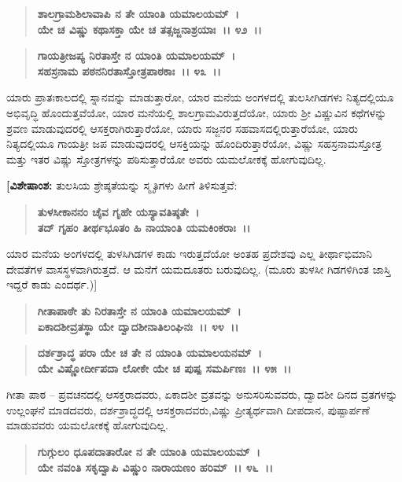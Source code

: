 \begin{verse}
\textbf{ಶಾಲಗ್ರಾಮಶಿಲಾವಾಪಿ ನ ತೇ ಯಾಂತಿ ಯಮಾಲಯಮ್~।}\\\textbf{ಯೇ ಚ ವಿಷ್ಣು ಕಥಾಸಕ್ತಾ ಯೇ ಚ ತತ್ಸಜ್ಜನಾಶ್ರಯಾಃ~।। ೪೨~।।}
\end{verse}

\begin{verse}
\textbf{ಗಾಯತ್ರೀಜಪ್ಯ ನಿರತಾಸ್ತೇ ನ ಯಾಂತಿ ಯಮಾಲಯಮ್~।}\\\textbf{ಸಹಸ್ರನಾಮ ಪಠನನಿರತಾಸ್ತೋತ್ರಪಾಠಕಾಃ~।। ೪೩~।।}
\end{verse}

ಯಾರು ಪ್ರಾತಃಕಾಲದಲ್ಲಿ ಸ್ನಾನವನ್ನು ಮಾಡುತ್ತಾರೋ, ಯಾರ ಮನೆಯ ಅಂಗಳದಲ್ಲಿ ತುಲಸೀಗಿಡಗಳು ನಿತ್ಯದಲ್ಲಿಯೂ ಅಭಿವೃದ್ಧಿ ಹೊಂದುತ್ತವೆಯೋ, ಯಾರ ಮನೆಯಲ್ಲಿ ಶಾಲಗ್ರಾಮವಿರುತ್ತದೆಯೋ, ಯಾರು ಶ‍್ರೀ ವಿಷ್ಣುವಿನ ಕಥೆಗಳನ್ನು ಶ್ರವಣ ಮಾಡುವುದರಲ್ಲಿ ಆಸಕ್ತರಾಗಿರುತ್ತಾರೆಯೋ, ಯಾರು ಸಜ್ಜನರ ಸಹವಾಸದಲ್ಲಿರುತ್ತಾರೆಯೋ, ಯಾರು ನಿತ್ಯದಲ್ಲಿಯೂ ಗಾಯತ್ರೀ ಜಪ ಮಾಡುವುದರಲ್ಲಿ ಆಸಕ್ತಿಯನ್ನು ಹೊಂದಿರುತ್ತಾರೆಯೋ, ವಿಷ್ಣು ಸಹಸ್ರನಾಮಸ್ತೋತ್ರ ಮತ್ತು ಇತರ ವಿಷ್ಣು ಸ್ತೋತ್ರಗಳನ್ನು ಪಠಿಸುತ್ತಾರೆಯೋ ಅವರು ಯಮಲೋಕಕ್ಕೆ ಹೋಗುವುದಿಲ್ಲ.

\textbf{[ವಿಶೇಷಾಂಶ:} ತುಲಸಿಯ ಶ್ರೇಷ್ಠತೆಯನ್ನು ಸ್ಮೃತಿಗಳು ಹೀಗೆ ತಿಳಿಸುತ್ತವೆ:

\begin{verse}
\textbf{ತುಳಸೀಕಾನನಂ ಚೈವ ಗೃಹೇ ಯಸ್ಯಾವತಿಷ್ಠತೇ~।}\\\textbf{ತದ್ ಗೃಹಂ ತೀರ್ಥಭೂತಂ ಹಿ ನಾಯಾಂತಿ ಯಮಕಿಂಕರಾಃ~।।}
\end{verse}

ಯಾರ ಮನೆಯ ಅಂಗಳದಲ್ಲಿ ತುಳಸಿಗಿಡಗಳ ಕಾಡು ಇರುತ್ತದೆಯೋ ಅಂತಹ ಪ್ರದೇಶವು ಎಲ್ಲ ತೀರ್ಥಾಭಿಮಾನಿ ದೇವತೆಗಳ ವಾಸಸ್ಥಳವಾಗಿರುತ್ತದೆ. ಆ ಮನೆಗೆ ಯಮದೂತರು ಬರುವುದಿಲ್ಲ. (ಮೂರು ತುಳಸೀ ಗಿಡಗಳಿಗಿಂತ ಜಾಸ್ತಿ ಇದ್ದರೆ ಕಾಡು ಎಂದರ್ಥ.)]

\begin{verse}
\textbf{ಗೀತಾಪಾಠೇ ತು ನಿರತಾಸ್ತೇ ನ ಯಾಂತಿ ಯಮಾಲಯಮ್~।}\\\textbf{ಏಕಾದಶೀವ್ರತಸ್ಥಾ ಯೇ ದ್ವಾದಶೀನಾತಿಲಂಘಿನಃ~।। ೪೪~।।} 
\end{verse}

\begin{verse}
\textbf{ದರ್ಶಶ್ರಾದ್ಧ ಪರಾ ಯೇ ಚ ತೇ ನ ಯಾಂತಿ ಯಮಾಲಯನಮ್~।}\\\textbf{ಯೇ ವಿಷ್ಣೋರ್ದೀಪದಾ ಲೋಕೇ ಯೇ ಚ ಪುಷ್ಪ ಸಮರ್ಪಿಣಃ~।। ೪೫~।। }
\end{verse}

ಗೀತಾ ಪಾಠ – ಪ್ರವಚನದಲ್ಲಿ ಆಸಕ್ತರಾದವರು, ಏಕಾದಶೀ ವ್ರತವನ್ನು ಅನುಸರಿಸುವವರು, ದ್ವಾದಶೀ ದಿನದ ವ್ರತಗಳನ್ನು ಉಲ್ಲಂಘನೆ ಮಾಡದವರು, ದರ್ಶಶ್ರಾದ್ಧದಲ್ಲಿ ಆಸಕ್ತರಾದವರು,ವಿಷ್ಣು ಪ್ರೀತ್ಯರ್ಥವಾಗಿ ದೀಪದಾನ, ಪುಷ್ಪಾರ್ಪಣೆ ಮಾಡುವವರು ಯಮಲೋಕಕ್ಕೆ ಹೋಗುವುದಿಲ್ಲ.

\begin{verse}
\textbf{ಗುಗ್ಗುಲಂ ಧೂಪದಾತಾರೋ ನ ತೇ ಯಾಂತಿ ಯಮಾಲಯಮ್~।}\\\textbf{ಯೇ ನವಂತಿ ಸಕೃದ್ವಾಪಿ ವಿಷ್ಣುಂ ನಾರಾಯಣಂ ಹರಿಮ್~।। ೪೬~।। }
\end{verse}

